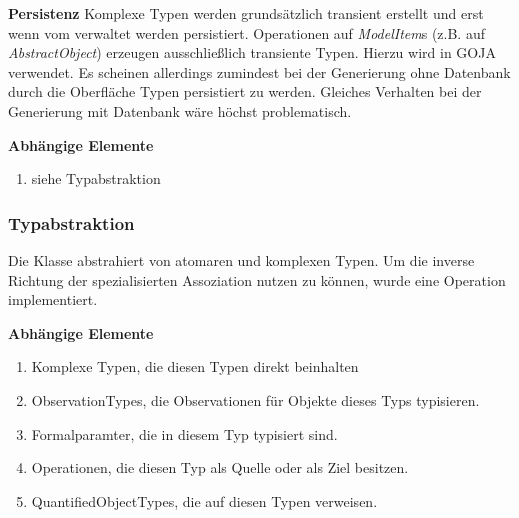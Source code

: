 \textbf{Persistenz} \newline
Komplexe Typen werden grundsätzlich transient erstellt und erst wenn vom  verwaltet werden persistiert. 
Operationen auf \emph{ModelItem}s (z.B.  auf \emph{AbstractObject}) erzeugen ausschließlich transiente Typen.
Hierzu wird in GOJA  verwendet. Es scheinen allerdings zumindest bei der Generierung ohne Datenbank
durch die Oberfläche Typen persistiert zu werden. Gleiches Verhalten bei der Generierung mit Datenbank wäre höchst problematisch.  

\textbf{Abhängige Elemente}
\begin{enumerate}
  		\item siehe Typabstraktion
\end{enumerate}

\subsubsection{Typabstraktion}
Die Klasse  abstrahiert von atomaren und komplexen Typen. Um die inverse Richtung der spezialisierten Assoziation 
 nutzen zu können, wurde eine Operation  implementiert. 

\textbf{Abhängige Elemente}
\begin{enumerate}
  		\item Komplexe Typen, die diesen Typen direkt beinhalten
  		\item ObservationTypes, die Observationen für Objekte dieses Typs typisieren.
  		\item Formalparamter, die in diesem Typ typisiert sind.
  		\item Operationen, die diesen Typ als Quelle oder als Ziel besitzen.
  		\item QuantifiedObjectTypes, die auf diesen Typen verweisen. 
\end{enumerate}
